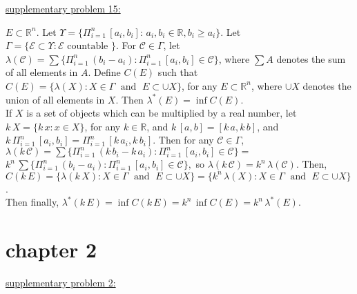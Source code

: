 \documentclass[12pt]{article}
\newcommand{\AND}[0]{ \; \textrm{ and } \;  }
\begin{document}
\begin{flushleft}
\underline{supplementary problem 15:}
\end{flushleft}

\begin{flushleft}
$E \subset \mathbb{R}^n$. Let $\Upsilon = \{ \Pi_{i=1}^n \, [a_i,b_i]:\,  a_i,b_i \in \mathbb{R}, b_i 	\ge a_i  \}$. Let $\Gamma = \{ \mathcal{E} \subset \Upsilon:  \mathcal{E} \textrm{ countable } \}$. For $\mathcal{C} \in \Gamma$, let $\lambda(\mathcal{C}) = \sum \{ \Pi_{i=1}^n \, (b_i-a_i): \Pi_{i=1}^n \, [a_i,b_i] \in \mathcal{C} \}$, where $\sum A$ denotes the sum of all elements in $A$. 
Define $C(E)$ such that $ C(E) = \{ \lambda(X): X \in \Gamma \AND  E \subset \cup X \} $, for any $E \subset \mathbb{R}^n$, where $\cup X$ denotes the union of all elements in $X$. Then $\lambda^*(E) = \inf C(E)$.\\
If $X$ is a set of objects which can be multiplied by a real number, let $k \, X = \{ k\, x: x \in X\}$, for any $k\in \mathbb{R}$, and $k \, [a,b] = [k \, a, k \, b]$, and $ k \, \Pi_{i=1}^n \, [a_i,b_i] = \Pi_{i=1}^n \, [k \, a_i, k \, b_i]$. Then for any $\mathcal{C} \in \Gamma$, 
$\lambda{(k \, \mathcal{C})} = \sum \{ \Pi_{i=1}^n \, (k \, b_i - k \, a_i): \Pi_{i=1}^n \, [a_i,b_i] \in \mathcal{C} \} =$ $k^n \, \sum \{ \Pi_{i=1}^n \, (b_i - a_i): \Pi_{i=1}^n \, [a_i,b_i] \in \mathcal{C} \},$ so $ \lambda{(k \, \mathcal{C})} = k^n \, \lambda(\mathcal{C}) $. Then, $ C( k \, E) = \{ \lambda(k \, X): X \in \Gamma \AND  E \subset \cup X \} = \{ k^n \, \lambda( X): X \in \Gamma \AND  E \subset \cup X \}$. \\
Then finally, $\lambda^*(k \, E) = \inf C( k \, E) = k^n \, \inf C(E) = k^n \, \lambda^*(E) $.
\end{flushleft}







\section*{chapter 2}


\begin{flushleft}
\underline{supplementary problem 2:}
\end{flushleft}
\end{document}
